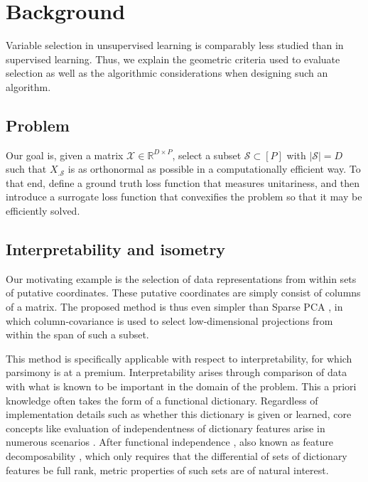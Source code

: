 \section{Background}

Variable selection in unsupervised learning is comparably less studied than in supervised learning.
Thus, we explain the geometric criteria used to evaluate selection as well as the algorithmic considerations when designing such an algorithm.

\subsection{Problem}

Our goal is, given a matrix $\mathcal X \in \mathbb R^{D \times P}$, select a subset $\mathcal S \subset [P]$ with $|\mathcal S| = D$ such that $X_{. \mathcal S}$ is as orthonormal as possible in a computationally efficient way.
To that end, define a ground truth loss function that measures unitariness, and then introduce a surrogate loss function that convexifies the problem so that it may be efficiently solved.

\subsection{Interpretability and isometry}

Our motivating example is the selection of data representations from within sets of putative coordinates.
These putative coordinates are simply consist of columns of a matrix.
The proposed method is thus even simpler than Sparse PCA \citep{Dey2017-mx, Bertsimas2022-qo, Bertsimas2022-dv}, in which column-covariance is used to select low-dimensional projections from within the span of such a subset.

This method is specifically applicable with respect to interpretability, for which parsimony is at a premium.
Interpretability arises through comparison of data with what is known to be important in the domain of the problem.
This a priori knowledge often takes the form of a functional dictionary.
Regardless of implementation details such as whether this dictionary is given or learned, core concepts like evaluation of independentness of dictionary features arise in numerous scenarios \citep{Chen2019-km, Koelle2022-ju, He2023-ch}.
After functional independence \citep{Koelle2022-ju}, also known as feature decomposability \citep{templeton2024scaling}, which only requires that the differential of sets of dictionary features be full rank, metric properties of such sets are of natural interest.

